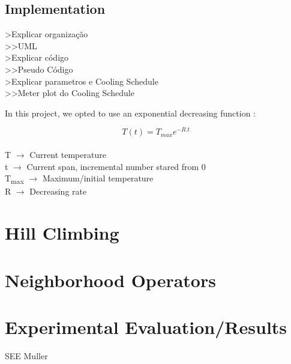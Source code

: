 \subsection{Implementation}

>Explicar organização\\
>>UML\\
>Explicar código\\
>>Pseudo Código\\
>Explicar parametros e Cooling Schedule\\
>>Meter plot do Cooling Schedule

In this project, we opted to use an exponential decreasing function \cite{CarvalhoLisbonNovember2004} :

\[T(t) = T_{max}e^{-R.t} \]
\\
T $\rightarrow$ Current temperature\\
t $\rightarrow$ Current span, incremental number stared from 0\\
T\textsubscript{max} $\rightarrow$ Maximum/initial temperature\\
R $\rightarrow$ Decreasing rate\\

\section{Hill Climbing}
\label{HillClimbing}

\section{Neighborhood Operators}
\label{NeighborhoodOperators}

\section{Experimental Evaluation/Results}

SEE Muller

